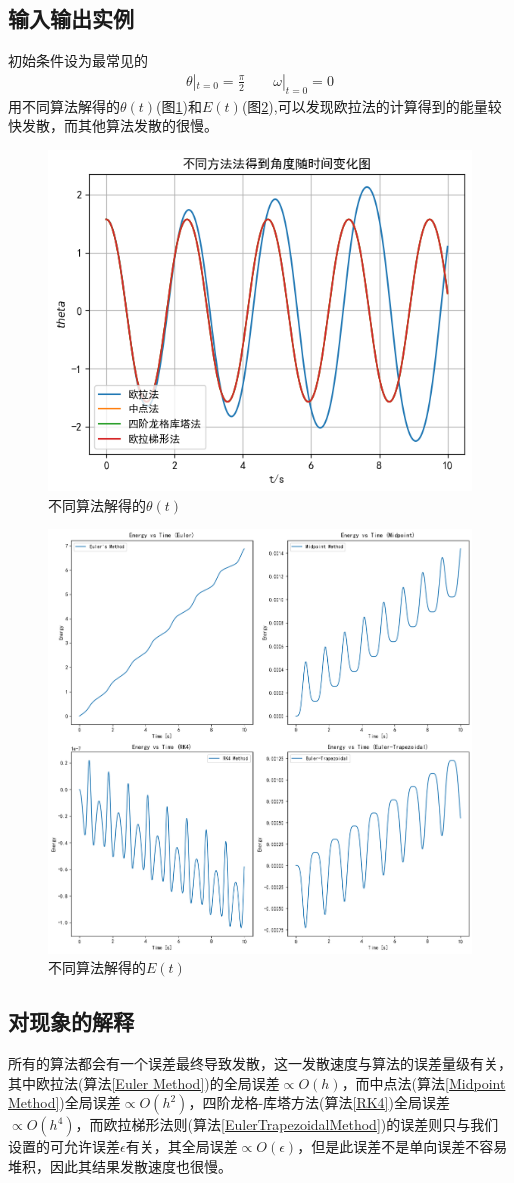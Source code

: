 \documentclass[11pt]{article}
\begin{document}
\subsection{输入输出实例}
初始条件设为最常见的
\begin{equation}
    \begin{aligned}
        \theta|_{t=0}=\frac{\pi}{2} \qquad \omega|_{t=0} = 0
    \end{aligned}
\end{equation}
用不同算法解得的$\theta(t)$(图\ref{fig:不同算法解得的theta})和$E(t)$(图\ref{fig:不同算法解得的E}),可以发现欧拉法的计算得到的能量较快发散，而其他算法发散的很慢。
\begin{figure}[h]
    \centering
    \includegraphics[width=0.5\linewidth]{t1_theta.png}
    \caption{不同算法解得的$\theta(t)$}
    \label{fig:不同算法解得的theta}
\end{figure}

\begin{figure}
    \centering
    \includegraphics[width=0.5\linewidth]{t1_E.png}
    \caption{不同算法解得的$E(t)$}
    \label{fig:不同算法解得的E}
\end{figure}
\subsection{对现象的解释}
所有的算法都会有一个误差最终导致发散，这一发散速度与算法的误差量级有关，其中欧拉法(算法\ref{Euler Method})的全局误差$\propto O(h)$，而中点法(算法\ref{Midpoint Method})全局误差$\propto O(h^2)$，四阶龙格-库塔方法(算法\ref{RK4})全局误差$\propto O(h^4)$，而欧拉梯形法则(算法\ref{EulerTrapezoidalMethod})的误差则只与我们设置的可允许误差$\epsilon$有关，其全局误差$\propto O(\epsilon)$，但是此误差不是单向误差不容易堆积，因此其结果发散速度也很慢。
\end{document}
